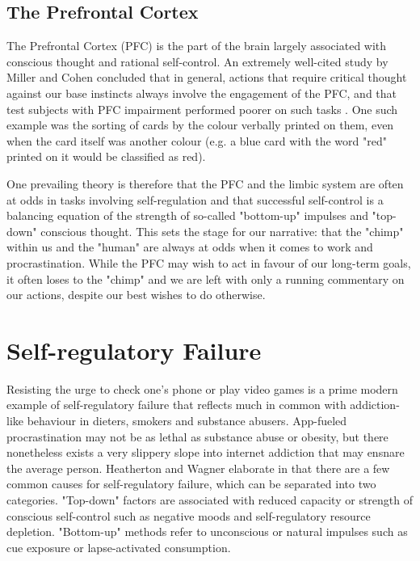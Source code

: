 \subsection{The Prefrontal Cortex}
The Prefrontal Cortex (PFC) is the part of the brain largely associated with conscious thought and rational self-control. An extremely well-cited study by Miller and Cohen concluded that in general, actions that require critical thought against our base instincts always involve the engagement of the PFC, and that test subjects with PFC impairment performed poorer on such tasks \cite{miller2001integrative}. One such example was the sorting of cards by the colour verbally printed on them, even when the card itself was another colour (e.g. a blue card with the word "red" printed on it would be classified as red).

One prevailing theory is therefore that the PFC and the limbic system are often at odds in tasks involving self-regulation \cite{heatherton2011cognitive} and that successful self-control is a balancing equation of the strength of so-called "bottom-up" impulses and "top-down" conscious thought. This sets the stage for our narrative: that the "chimp" within us and the "human" are always at odds when it comes to work and procrastination. While the PFC may wish to act in favour of our long-term goals, it often loses to the "chimp" and we are left with only a running commentary on our actions, despite our best wishes to do otherwise.

\section{Self-regulatory Failure}
Resisting the urge to check one's phone or play video games is a prime modern example of self-regulatory failure that reflects much in common with addiction-like behaviour in dieters, smokers and substance abusers. App-fueled procrastination may not be as lethal as substance abuse or obesity, but there nonetheless exists a very slippery slope into internet addiction that may ensnare the average person. Heatherton and Wagner elaborate in \cite{heatherton2011cognitive} that there are a few common causes for self-regulatory failure, which can be separated into two categories. "Top-down" factors are associated with reduced capacity or strength of conscious self-control such as negative moods and self-regulatory resource depletion. "Bottom-up" methods refer to unconscious or natural impulses such as cue exposure or lapse-activated consumption.

